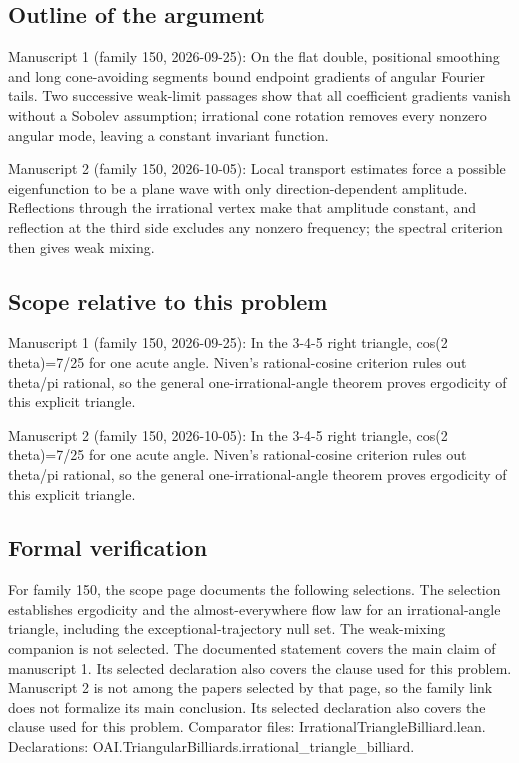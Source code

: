 \documentclass[11pt]{article}
\begin{document}
\subsection{Outline of the argument}
Manuscript 1 (family 150, 2026-09-25): On the flat double, positional smoothing and long cone-avoiding segments bound endpoint gradients of angular Fourier tails. Two successive weak-limit passages show that all coefficient gradients vanish without a Sobolev assumption; irrational cone rotation removes every nonzero angular mode, leaving a constant invariant function.

Manuscript 2 (family 150, 2026-10-05): Local transport estimates force a possible eigenfunction to be a plane wave with only direction-dependent amplitude. Reflections through the irrational vertex make that amplitude constant, and reflection at the third side excludes any nonzero frequency; the spectral criterion then gives weak mixing.

\subsection{Scope relative to this problem}
Manuscript 1 (family 150, 2026-09-25): In the 3-4-5 right triangle, cos(2 theta)=7/25 for one acute angle. Niven’s rational-cosine criterion rules out theta/pi rational, so the general one-irrational-angle theorem proves ergodicity of this explicit triangle.

Manuscript 2 (family 150, 2026-10-05): In the 3-4-5 right triangle, cos(2 theta)=7/25 for one acute angle. Niven’s rational-cosine criterion rules out theta/pi rational, so the general one-irrational-angle theorem proves ergodicity of this explicit triangle.

\subsection{Formal verification}
For family 150, the scope page documents the following selections. The selection establishes ergodicity and the almost-everywhere flow law for an irrational-angle triangle, including the exceptional-trajectory null set. The weak-mixing companion is not selected. The documented statement covers the main claim of manuscript 1. Its selected declaration also covers the clause used for this problem. Manuscript 2 is not among the papers selected by that page, so the family link does not formalize its main conclusion. Its selected declaration also covers the clause used for this problem. Comparator files: IrrationalTriangleBilliard.lean. Declarations: OAI.TriangularBilliards.irrational\_triangle\_billiard.
\end{document}
